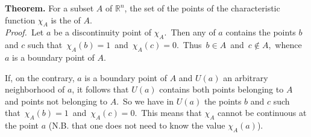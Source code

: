 \documentclass[12pt]{article}
\begin{document}
\textbf{Theorem.}\; For a subset $A$ of $\mathbb{R}^n$, the set of the 
points of the characteristic function $\chi_A$ is the 
 of $A$.\\

{\it Proof.}\, Let $a$ be a discontinuity point of $\chi_A$.\, Then any 
 of $a$ 
contains the points $b$ and $c$ such that\, $\chi_A(b) = 1$\, and\, $\chi_A(c) = 0$.\, Thus\, 
$b \in A$\, and\, $c \notin A$,\, whence $a$ is a boundary point of $A$.

If, on the contrary, $a$ is a boundary point of $A$ and $U(a)$ an arbitrary neighborhood of 
$a$, it follows that $U(a)$ contains both points belonging to $A$ and points not belonging to 
$A$.\, So we have in $U(a)$ the points $b$ and $c$ such that\, $\chi_A(b) = 1$\, and\, 
$\chi_A(c) = 0$.\, This means that $\chi_A$ cannot be continuous at the point $a$ (N.B. that
one does not need to know the value $\chi_A(a)$).
\end{document}
